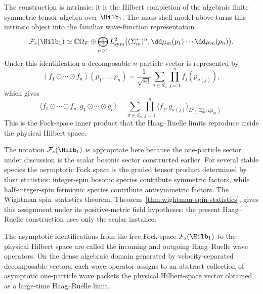 The construction is intrinsic: it is the Hilbert completion of the algebraic
finite symmetric tensor algebra over \(\Hilb_1\).  The mass-shell model above
turns this intrinsic object into the familiar wave-function representation
\[
  \mathcal F_s(\Hilb_1)
  \simeq
  \mathbb C\Omega_F
  \oplus
  \bigoplus_{n\ge1}
  L^2_{\mathrm{sym}}
  \bigl((\Sigma_m^+)^n,\dd\mu_m(p_1)\cdots\dd\mu_m(p_n)\bigr).
\]
Under this identification a decomposable \(n\)-particle vector is represented
by
\[
  (f_1\odot\cdots\odot f_n)(p_1,\ldots,p_n)
  =
  \frac{1}{\sqrt{n!}}
  \sum_{\sigma\in S_n}
  \prod_{j=1}^n f_j(p_{\sigma(j)}),
\]
which gives
\[
  \langle f_1\odot\cdots\odot f_n,
  g_1\odot\cdots\odot g_n\rangle
  =
  \sum_{\sigma\in S_n}
  \prod_{j=1}^n
  \langle f_j,g_{\sigma(j)}\rangle_{L^2(\Sigma_m^+,\dd\mu_m)} .
\]
This is the Fock-space inner product that the Haag--Ruelle limits reproduce
inside the physical Hilbert space.

\begin{remark}
The notation \(\mathcal F_s(\Hilb_1)\) is appropriate here because the
one-particle sector under discussion is the scalar bosonic sector constructed
earlier.  For several stable species the asymptotic Fock space is the graded
tensor product determined by their statistics: integer-spin bosonic species
contribute symmetric factors, while half-integer-spin fermionic species
contribute antisymmetric factors.  The Wightman spin--statistics theorem,
Theorem~\ref{thm:wightman-spin-statistics}, gives this assignment under its
positive-metric field hypotheses; the present Haag--Ruelle construction uses
only the scalar instance.
\end{remark}

\begin{definition}
\label{def:hr-wave-operators-separated-domain}
The asymptotic identifications from the free Fock space
\(\mathcal F_s(\Hilb_1)\) to the physical Hilbert space are called the
incoming and outgoing Haag--Ruelle wave operators.  On the dense algebraic
domain generated by velocity-separated decomposable vectors, each wave
operator assigns to an abstract collection of asymptotic one-particle wave
packets the physical Hilbert-space vector obtained as a large-time
Haag--Ruelle limit.
\end{definition}

